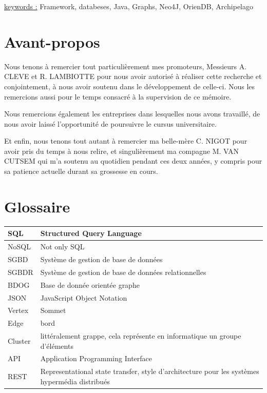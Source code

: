 \documentclass[a4paper,fleqn,12pt]{report}
\begin{document}
\quad \quad \underline{keywords :} Framework, databeses, Java, Graphs, Neo4J, OrienDB, Archipelago

\chapter*{Avant-propos}

Nous tenons à remercier tout particulièrement mes promoteurs, Messieurs A. CLEVE et R. LAMBIOTTE pour nous avoir autorisé à réaliser cette recherche et conjointement, à nous avoir soutenu dans le développement de celle-ci. Nous les remercions aussi pour le temps consacré à la supervision de ce mémoire. 

Nous remercions également les entreprises dans lesquelles nous avons travaillé, de nous avoir laissé l'opportunité de poursuivre le cursus universitaire.

Et enfin, nous tenons tout autant à remercier ma belle-mère C. NIGOT pour avoir pris du temps à nous relire, et singulièrement ma compagne M. VAN CUTSEM qui m'a soutenu au quotidien pendant ces deux années, y compris pour sa patience actuelle durant sa grossesse en cours.


\tableofcontents
\newpage
\chapter*{Glossaire}
\begin{center}
\begin{tabular}[c]{ l p{14cm} }
 SQL  & Structured Query Language \\ \hline
 NoSQL  & Not only SQL \\ \hline
 SGBD  & Système de gestion de base de données \\ \hline
 SGBDR  & Système de gestion de base de données relationnelles \\ \hline
 BDOG  & Base de donnée orientée graphe \\ \hline
 JSON  & JavaScript Object Notation \\ \hline
 Vertex  & Sommet \\ \hline
 Edge  & bord \\ \hline
 Cluster  & littéralement grappe, cela représente en informatique un groupe d'éléments \\ \hline
 API  & Application Programming Interface  \\ \hline
 REST  & Representational state transfer, style d'architecture pour les systèmes hypermédia distribués \\ \hline
\end{tabular}
\end{center}
\end{document}
